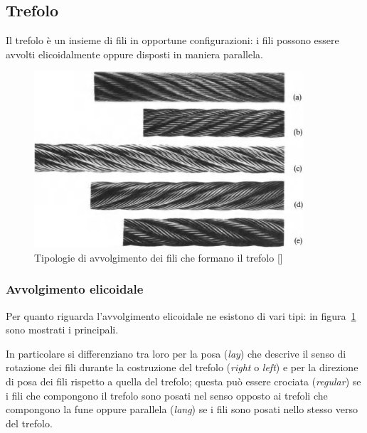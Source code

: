 \subsection{Trefolo}
Il trefolo è un insieme di fili in opportune configurazioni: i fili possono essere avvolti elicoidalmente oppure disposti in maniera parallela.

\begin{figure}[]
	\centering
	\includegraphics[width=10cm]{Immagini/Avvolgimento_Trefolo}
	\caption{Tipologie di avvolgimento dei fili che formano il trefolo [\cite{costello:fune}]}
	\label{fig:avvolgimento_trefolo}
\end{figure}

\subsubsection*{Avvolgimento elicoidale}
Per quanto riguarda l'avvolgimento elicoidale ne esistono di vari tipi: in figura~\ref{fig:avvolgimento_trefolo} sono mostrati i principali.

In particolare si differenziano tra loro per la posa (\textit{lay}) che descrive il senso di rotazione dei fili durante la costruzione del trefolo (\textit{right} o \textit{left}) e per la direzione di posa dei fili rispetto a quella del trefolo; questa può essere crociata (\textit{regular}) se i fili che compongono il trefolo sono posati nel senso opposto ai trefoli che compongono la fune oppure parallela (\textit{lang}) se i fili sono posati nello stesso verso del trefolo.

